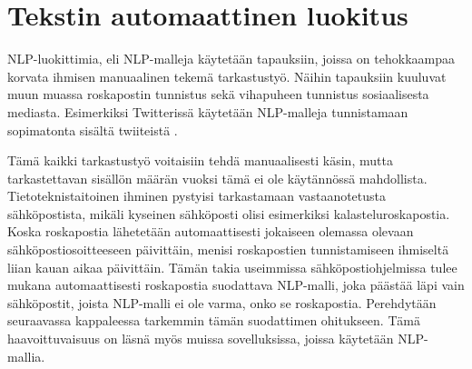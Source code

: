 \chapter{Tekstin automaattinen luokitus\label{methods}}

NLP-luokittimia, eli NLP-malleja käytetään tapauksiin, joissa on tehokkaampaa korvata ihmisen manuaalinen tekemä tarkastustyö. Näihin tapauksiin kuuluvat muun muassa roskapostin tunnistus sekä vihapuheen tunnistus sosiaalisesta mediasta. Esimerkiksi Twitterissä käytetään NLP-malleja tunnistamaan sopimatonta sisältä twiiteistä \citep{twitternlp}.

Tämä kaikki tarkastustyö voitaisiin tehdä manuaalisesti käsin, mutta tarkastettavan sisällön määrän vuoksi tämä ei ole käytännössä mahdollista. Tietoteknistaitoinen ihminen pystyisi tarkastamaan vastaanotetusta sähköpostista, mikäli kyseinen sähköposti olisi esimerkiksi kalasteluroskapostia. Koska roskapostia lähetetään automaattisesti jokaiseen olemassa olevaan sähköpostiosoitteeseen päivittäin, menisi roskapostien tunnistamiseen ihmiseltä liian kauan aikaa päivittäin. Tämän takia useimmissa sähköpostiohjelmissa tulee mukana automaattisesti roskapostia suodattava NLP-malli, joka päästää läpi vain sähköpostit, joista NLP-malli ei ole varma, onko se roskapostia. Perehdytään seuraavassa kappaleessa tarkemmin tämän suodattimen ohitukseen. Tämä haavoittuvaisuus on läsnä myös muissa sovelluksissa, joissa käytetään NLP-mallia.